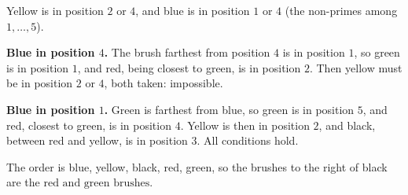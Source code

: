 Yellow is in position $2$ or $4$, and blue is in position $1$ or $4$ (the non-primes among $1,\ldots,5$).

\textbf{Blue in position $4$.} The brush farthest from position $4$ is in position $1$, so green is in position $1$, and red, being closest to green, is in position $2$. Then yellow must be in position $2$ or $4$, both taken: impossible.

\textbf{Blue in position $1$.} Green is farthest from blue, so green is in position $5$, and red, closest to green, is in position $4$. Yellow is then in position $2$, and black, between red and yellow, is in position $3$. All conditions hold.

The order is blue, yellow, black, red, green, so the brushes to the right of black are the $\boxed{\text{red and green brushes}}$.
